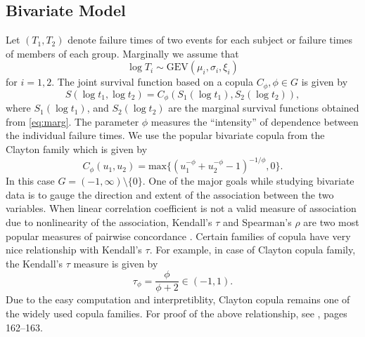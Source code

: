 \documentclass[11pt]{article}
\theoremstyle{remboldstyle}
\begin{document}
\subsection{Bivariate Model}
\noindent
Let $(T_1, T_2)$ denote failure times of two events for each subject or failure times
of members of each group. Marginally we assume that
\begin{equation}
  \label{eq:marg}
\log T_i \sim \mbox{GEV} (\mu_i, \sigma_i, \xi_i)
\end{equation}
for $i= 1,2$. The joint survival function based on a copula $C_{\phi}, \phi \in G$ is given by
\begin{equation}
  \label{eq:survcop}
  S(\log t_1, \log t_2) = C_\phi (S_1(\log t_1), S_2(\log t_2)),
\end{equation}
where $S_1(\log t_1)$, and $S_2(\log t_2)$ are the marginal survival functions obtained from \eqref{eq:marg}. The parameter $\phi$ measures the ``intensity'' of dependence between the individual failure
times. We use the popular bivariate copula from the Clayton family which is given by
\begin{equation}
  \label{eq:clay}
  C_\phi (u_1, u_2) = \mbox{max} \{(u_1^{-\phi} + u_2^{-\phi} - 1)^{-1/\phi}, 0\} .
\end{equation}
In this case $G= (-1, \infty)\setminus \{0\}$. One of the major goals while studying bivariate data is to gauge the direction and extent of the association between the two variables. When linear correlation coefficient is not a valid measure of association due to nonlinearity of the association, Kendall's $\tau$ and Spearman's $\rho$ are two most popular measures of pairwise concordance \cite[][chapter 5]{nelson:1999}. Certain families of copula have very nice relationship with Kendall's $\tau$. For example, in case of Clayton copula family, the Kendall's $\tau$ measure is given by
\[
\tau_\phi = \frac{\phi}{\phi+2} \in (-1,1).
\]
Due to the easy computation and interpretiblity, Clayton copula remains one of the widely used copula families. 
For proof of the above relationship, see \cite{nelson:1999}, pages 162--163.
\end{document}
